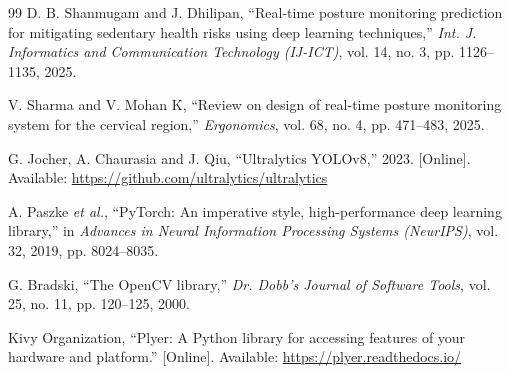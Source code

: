 ﻿\documentclass[12pt,a4paper]{article}
\begin{document}
\begin{thebibliography}{99}
D. B. Shanmugam and J. Dhilipan, ``Real-time posture monitoring prediction for mitigating sedentary health risks using deep learning techniques,'' \textit{Int. J. Informatics and Communication Technology (IJ-ICT)}, vol. 14, no. 3, pp. 1126--1135, 2025.

V. Sharma and V. Mohan K, ``Review on design of real-time posture monitoring system for the cervical region,'' \textit{Ergonomics}, vol. 68, no. 4, pp. 471--483, 2025.

G. Jocher, A. Chaurasia and J. Qiu, ``Ultralytics YOLOv8,'' 2023. [Online]. Available: \url{https://github.com/ultralytics/ultralytics}

A. Paszke \textit{et al.}, ``PyTorch: An imperative style, high-performance deep learning library,'' in \textit{Advances in Neural Information Processing Systems (NeurIPS)}, vol. 32, 2019, pp. 8024--8035.

G. Bradski, ``The OpenCV library,'' \textit{Dr. Dobb's Journal of Software Tools}, vol. 25, no. 11, pp. 120--125, 2000.

Kivy Organization, ``Plyer: A Python library for accessing features of your hardware and platform.'' [Online]. Available: \url{https://plyer.readthedocs.io/}

\end{thebibliography}
\endgroup
\end{document}
